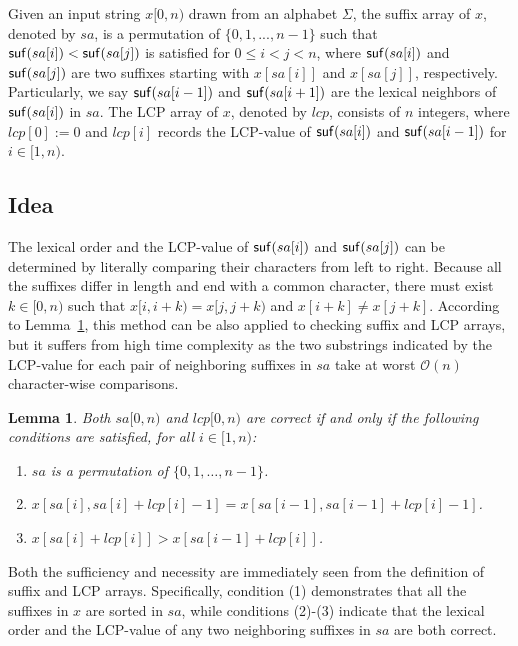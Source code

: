 \documentclass[10pt,journal,compsoc]{IEEEtran}
\newtheorem{Lemma}{Lemma}
\begin{document}
Given an input string $x[0, n)$ drawn from an alphabet $\Sigma$, the suffix array of $x$, denoted by $sa$, is a permutation of $\{0, 1, ..., n - 1\}$ such that ${\sf suf}(sa[i]) < {\sf suf}(sa[j])$ is satisfied for $0 \le i < j < n$, where ${\sf suf}(sa[i])$ and ${\sf suf}(sa[j])$ are two suffixes starting with $x[sa[i]]$ and $x[sa[j]]$, respectively. Particularly, we say ${\sf suf}(sa[i - 1])$ and  ${\sf suf}(sa[i + 1])$ are the lexical neighbors of ${\sf suf}(sa[i])$ in $sa$. The LCP array of $x$, denoted by $lcp$, consists of $n$ integers, where $lcp[0]:=0$ and $lcp[i]$ records the LCP-value of ${\sf suf}(sa[i])$ and ${\sf suf}(sa[i - 1])$ for $i \in [1, n)$. 


\subsection{Idea} \label{sec:method1:idea}

The lexical order and the LCP-value of ${\sf suf}(sa[i])$ and ${\sf suf}(sa[j])$ can be determined by literally comparing their characters from left to right. Because all the suffixes differ in length and end with a common character, there must exist $k \in [0, n)$ such that $x[i, i + k) = x[j, j + k)$ and $x[i + k] \ne x[j + k]$. According to Lemma~\ref{lemma:1}, this method can be also applied to checking suffix and LCP arrays, but it suffers from high time complexity as the two substrings indicated by the LCP-value for each pair of neighboring suffixes in $sa$ take at worst $\mathcal{O}(n)$ character-wise comparisons.

\begin{Lemma} \label{lemma:1}
	Both $sa[0, n)$ and $lcp[0, n)$ are correct if and only if the following conditions are satisfied, for all $i \in [1, n)$:
	\begin{enumerate}[(1)]
		\item
		$sa$ is a permutation of $\{0, 1, \dots, n - 1\}$.
		\item
		$x[sa[i], sa[i] + lcp[i] - 1] = x[sa[i - 1], sa[i - 1] + lcp[i] - 1]$.
		\item
		$x[sa[i] + lcp[i]] > x[sa[i - 1] + lcp[i]]$. 	
	\end{enumerate}
\end{Lemma}

\begin{IEEEproof}
	Both the sufficiency and necessity are immediately seen from the definition of suffix and LCP arrays. Specifically, condition (1) demonstrates that all the suffixes in $x$ are sorted in $sa$, while conditions (2)-(3) indicate that the lexical order and the LCP-value of any two neighboring suffixes in $sa$ are both correct.
\end{IEEEproof}
\end{document}
